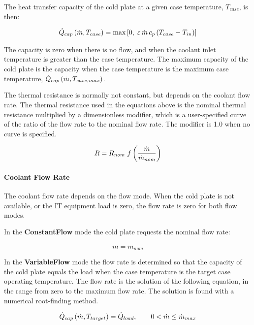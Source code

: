 The heat transfer capacity of the cold plate at a given case temperature, \(T_{case}\), is then:

\begin{equation}
\dot{Q}_{cap}\left(\dot{m}, T_{case}\right) = \max\left[0, \; \varepsilon \, \dot{m} \, c_p \left(T_{case} - T_{in}\right)\right]
\end{equation}

The capacity is zero when there is no flow, and when the coolant inlet temperature is greater than the case temperature. The maximum capacity of the cold plate is the capacity when the case temperature is the maximum case temperature, \(\dot{Q}_{cap}\left(\dot{m}, T_{case,max}\right)\).

The thermal resistance is normally not constant, but depends on the coolant flow rate. The thermal resistance used in the equations above is the nominal thermal resistance multiplied by a dimensionless modifier, which is a user-specified curve of the ratio of the flow rate to the nominal flow rate. The modifier is 1.0 when no curve is specified.

\begin{equation}
R = R_{nom} \; f\left(\frac{\dot{m}}{\dot{m}_{nom}}\right)
\end{equation}

\paragraph{Coolant Flow Rate}\label{coolant-flow-rate-coilcoolingitecoldplate}

The coolant flow rate depends on the flow mode. When the cold plate is not available, or the IT equipment load is zero, the flow rate is zero for both flow modes.

In the \textbf{ConstantFlow} mode the cold plate requests the nominal flow rate:

\begin{equation}
\dot{m} = \dot{m}_{nom}
\end{equation}

In the \textbf{VariableFlow} mode the flow rate is determined so that the capacity of the cold plate equals the load when the case temperature is the target case operating temperature. The flow rate is the solution of the following equation, in the range from zero to the maximum flow rate. The solution is found with a numerical root-finding method.

\begin{equation}
\dot{Q}_{cap}\left(\dot{m}, T_{target}\right) = \dot{Q}_{load}, \qquad 0 < \dot{m} \le \dot{m}_{max}
\end{equation}

